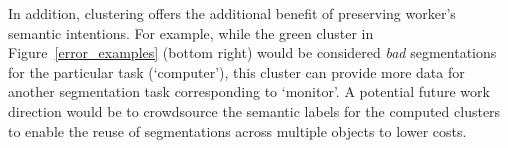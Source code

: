 \par In addition, clustering offers the additional benefit of preserving worker's semantic intentions. For example, while the green cluster in Figure~\ref{error_examples} (bottom right) would be considered \textit{bad} segmentations for the particular task (`computer'), this cluster can provide more data for another segmentation task corresponding to `monitor'. A potential future work direction would be to crowdsource the semantic labels for the computed clusters to enable the reuse of segmentations across multiple objects to lower costs.
